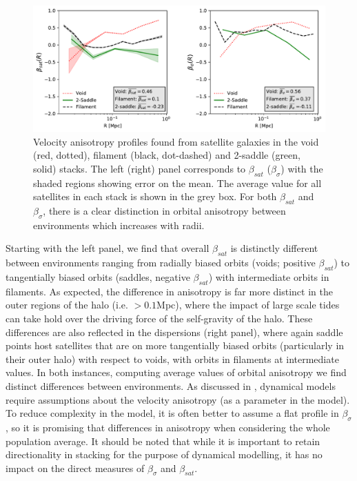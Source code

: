 \begin{figure}
	\includegraphics[width=\linewidth]{thesis/latex/dyn_mod_files/disperse_beta_paper.pdf}
    \caption{Velocity anisotropy profiles found from satellite galaxies in the void (red, dotted), filament (black, dot-dashed) and 2-saddle (green, solid) stacks. The left (right) panel corresponds to $\beta_{sat}$ ($\beta_{\sigma}$) with the shaded regions showing error on the mean. The average value for all satellites in each stack is shown in the grey box. For both $\beta_{sat}$ and $\beta_{\sigma}$, there is a clear distinction in orbital anisotropy between environments which increases with radii.}
    \label{fig:beta_stack}
\end{figure}

Starting with the left panel, we find that overall $\beta_{sat}$ is distinctly different between environments ranging from radially biased orbits (voids; positive $\beta_{sat}$) to tangentially biased orbits (saddles, negative $\beta_{sat}$) with intermediate orbits in filaments. As expected, the difference in anisotropy is far more distinct in the outer regions of the halo (i.e. $> 0.1$Mpc), where the impact of large scale tides can take hold over the driving force of the self-gravity of the halo. These differences are also reflected in the dispersions (right panel), where again saddle points host satellites that are on more tangentially biased orbits (particularly in their outer halo) with respect to voids, with orbits in filaments at intermediate values. In both instances, computing average values of orbital anisotropy we find distinct differences between environments. As discussed in \red{\S}, dynamical models require assumptions about the velocity anisotropy (as a parameter in the model). To reduce complexity in the model, it is often better to assume a flat profile in $\beta_{\sigma}$, so it is promising that differences in anisotropy when considering the whole population average. It should be noted that while it is important to retain directionality in stacking for the purpose of dynamical modelling, it has no impact on the direct measures of $\beta_{\sigma}$ and $\beta_{sat}$.

